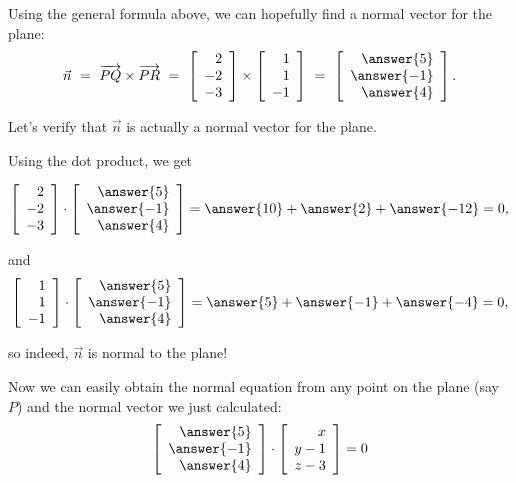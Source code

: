 \documentclass{ximera}
\begin{document}
\begin{solution}
    Using the general formula above, we can hopefully find a normal vector for the
    plane:
    \begin{equation*}
      \vect{n}
      ~=~
      \longvect{PQ} \times \longvect{PR}
      ~=~
      \startmat{r} 2 \\ -2 \\ -3 \stopmat
      \times
      \startmat{r} 1 \\ 1 \\ -1 \stopmat
      ~=~
      \startmat{r} \answer{5} \\ \answer{-1} \\ \answer{4} \stopmat.
    \end{equation*}
    \begin{center}
    \end{center}

    Let's verify that $\vec{n}$ is actually a normal vector for the plane.

    Using the dot product, we get

    $$\startmat{r} 2 \\ -2 \\ -3 \stopmat\cdot \startmat{r} \answer{5} \\ \answer{-1} \\ \answer{4} \stopmat=\answer{10}+\answer{2}+\answer{-12}=0,$$

    and $$\startmat{r} 1 \\ 1 \\ -1 \stopmat\cdot \startmat{r} \answer{5} \\ \answer{-1} \\ \answer{4} \stopmat=\answer{5}+\answer{-1}+\answer{-4}=0,$$

    so indeed, $\vec{n}$ is normal to the plane!

 

    Now we can easily obtain the normal equation from any point on the
    plane (say $P$) and the normal vector we just calculated:
    \begin{equation*}
      \startmat{r}\answer{5} \\ \answer{-1} \\ \answer{4} \stopmat
      \cdot
      \startmat{r} x \\ y-1 \\ z-3 \stopmat
      =
      0
    \end{equation*}





\end{solution}
\end{document}

